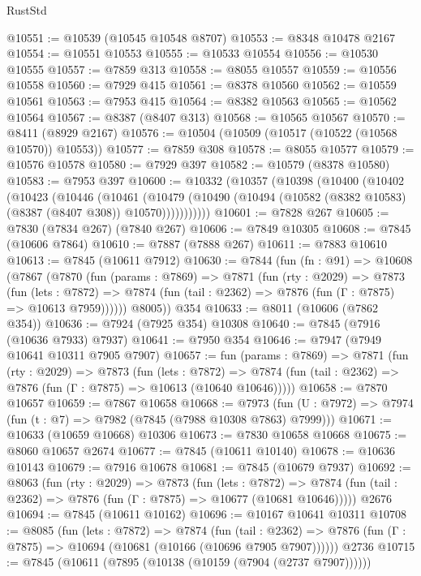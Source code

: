 \begin{lexlean}{RustStd}
\begin{coremodule}
@10551 := @10539 (@10545 @10548 @8707)
@10553 := @8348 @10478 @2167
@10554 := @10551 @10553
@10555 := @10533 @10554
@10556 := @10530 @10555
@10557 := @7859 @313
@10558 := @8055 @10557
@10559 := @10556 @10558
@10560 := @7929 @415
@10561 := @8378 @10560
@10562 := @10559 @10561
@10563 := @7953 @415
@10564 := @8382 @10563
@10565 := @10562 @10564
@10567 := @8387 (@8407 @313)
@10568 := @10565 @10567
@10570 := @8411 (@8929 @2167)
@10576 := @10504 (@10509 (@10517 (@10522 (@10568 @10570)) @10553))
@10577 := @7859 @308
@10578 := @8055 @10577
@10579 := @10576 @10578
@10580 := @7929 @397
@10582 := @10579 (@8378 @10580)
@10583 := @7953 @397
@10600 := @10332
    (@10357
      (@10398
        (@10400
          (@10402
            (@10423
              (@10446
                (@10461
                  (@10479
                    (@10490 (@10494 (@10582 (@8382 @10583) (@8387 (@8407 @308)) @10570)))))))))))
@10601 := @7828 @267
@10605 := @7830 (@7834 @267) (@7840 @267)
@10606 := @7849 @10305
@10608 := @7845 (@10606 @7864)
@10610 := @7887 (@7888 @267)
@10611 := @7883 @10610
@10613 := @7845 (@10611 @7912)
@10630 := @7844
    (fun (fn : @91) =>
    @10608
      (@7867
        (@7870
          (fun (params : @7869) =>
          @7871
            (fun (rty : @2029) =>
            @7873
              (fun (lets : @7872) =>
              @7874 (fun (tail : @2362) => @7876 (fun (Γ : @7875) => @10613 @7959))))))
        @8005))
    @354
@10633 := @8011 (@10606 (@7862 @354))
@10636 := @7924 (@7925 @354) @10308
@10640 := @7845 (@7916 (@10636 @7933) @7937)
@10641 := @7950 @354
@10646 := @7947 (@7949 @10641 @10311 @7905 @7907)
@10657 := fun (params : @7869) =>
  @7871
    (fun (rty : @2029) =>
    @7873
      (fun (lets : @7872) =>
      @7874 (fun (tail : @2362) => @7876 (fun (Γ : @7875) => @10613 (@10640 @10646)))))
@10658 := @7870 @10657
@10659 := @7867 @10658
@10668 := @7973
    (fun (U : @7972) => @7974 (fun (t : @7) => @7982 (@7845 (@7988 @10308 @7863) @7999)))
@10671 := @10633 (@10659 @10668) @10306
@10673 := @7830 @10658 @10668
@10675 := @8060 @10657 @2674
@10677 := @7845 (@10611 @10140)
@10678 := @10636 @10143
@10679 := @7916 @10678
@10681 := @7845 (@10679 @7937)
@10692 := @8063
    (fun (rty : @2029) =>
    @7873
      (fun (lets : @7872) =>
      @7874 (fun (tail : @2362) => @7876 (fun (Γ : @7875) => @10677 (@10681 @10646)))))
    @2676
@10694 := @7845 (@10611 @10162)
@10696 := @10167 @10641 @10311
@10708 := @8085
    (fun (lets : @7872) =>
    @7874
      (fun (tail : @2362) =>
      @7876 (fun (Γ : @7875) => @10694 (@10681 (@10166 (@10696 @7905 @7907))))))
    @2736
@10715 := @7845 (@10611 (@7895 (@10138 (@10159 (@7904 (@2737 @7907))))))

\end{coremodule}
\end{lexlean}
